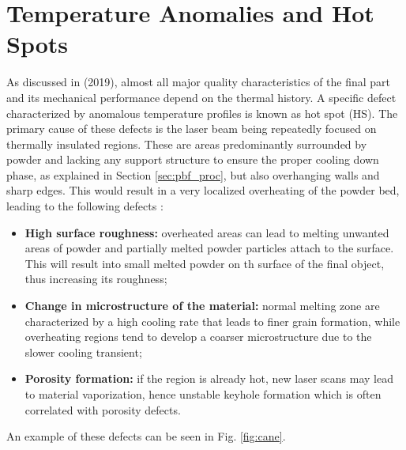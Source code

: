 \section{Temperature Anomalies and Hot Spots}
\label{sec:hotspot}
As discussed in \citeauthor{williams_situ_2019} (2019), almost all major quality characteristics of the final part and its mechanical performance depend on the thermal history. A specific defect characterized by anomalous temperature profiles is known as hot spot (HS). The primary cause of these defects is the laser beam being repeatedly focused on thermally insulated regions. These are areas predominantly surrounded by powder and lacking any support structure to ensure the proper cooling down phase, as explained in Section \ref{sec:pbf_proc}, but also overhanging walls and sharp edges. This would result in a very localized overheating of the powder bed, leading to the following defects \cite{bugatti_towards_2022}:
\begin{itemize}
    \item \textbf{High surface roughness:} overheated areas can lead to melting unwanted areas of powder and partially melted powder particles attach to the surface. This will result into small melted powder on th surface of the final object, thus increasing its roughness;
    \item \textbf{Change in microstructure of the material:} normal melting zone are characterized by a high cooling rate that leads to finer grain formation, while overheating regions tend to develop a coarser microstructure due to the slower cooling transient;
    \item \textbf{Porosity formation:} if the region is already hot, new laser scans may lead to material vaporization, hence unstable keyhole formation which is often correlated with porosity defects.
\end{itemize} An example of these defects can be seen in Fig. \ref{fig:cane}.

